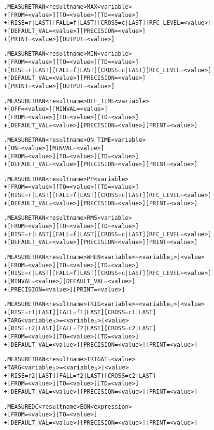 \begin{Command}
\begin{alltt}
.MEASURE TRAN <result name> MAX <variable>
+ [FROM=<value>] [TO=<value>] [TD=<value>]
+ [RISE=r|LAST] [FALL=f|LAST] [CROSS=c|LAST] [RFC_LEVEL=<value>]
+ [DEFAULT_VAL=<value>] [PRECISION=<value>] 
+ [PRINT=<value>] [OUTPUT=<value>]

.MEASURE TRAN <result name> MIN <variable>
+ [FROM=<value>] [TO=<value>] [TD=<value>]
+ [RISE=r|LAST] [FALL=f|LAST] [CROSS=c|LAST] [RFC_LEVEL=<value>]
+ [DEFAULT_VAL=<value>] [PRECISION=<value>] 
+ [PRINT=<value>] [OUTPUT=<value>]

.MEASURE TRAN <result name> OFF_TIME <variable>
+ [OFF=<value>] [MINVAL=<value>]
+ [FROM=<value>] [TO=<value>] [TD=<value>]
+ [DEFAULT_VAL=<value>] [PRECISION=<value>] [PRINT=<value>]

.MEASURE TRAN <result name> ON_TIME <variable>
+ [ON=<value>] [MINVAL=<value>]
+ [FROM=<value>] [TO=<value>] [TD=<value>]
+ [DEFAULT_VAL=<value>] [PRECISION=<value>] [PRINT=<value>]

.MEASURE TRAN <result name> PP <variable>
+ [FROM=<value>] [TO=<value>] [TD=<value>]
+ [RISE=r|LAST] [FALL=f|LAST] [CROSS=c|LAST] [RFC_LEVEL=<value>]
+ [DEFAULT_VAL=<value>] [PRECISION=<value>] [PRINT=<value>]

.MEASURE TRAN <result name> RMS <variable>
+ [FROM=<value>] [TO=<value>] [TD=<value>]
+ [RISE=r|LAST] [FALL=f|LAST] [CROSS=c|LAST] [RFC_LEVEL=<value>]
+ [DEFAULT_VAL=<value>] [PRECISION=<value>] [PRINT=<value>]

.MEASURE TRAN <result name> WHEN <variable>=<variable\(\sb{2}\)>|<value>
+ [FROM=<value>] [TO=<value>] [TD=<value>] 
+ [RISE=r|LAST] [FALL=f|LAST] [CROSS=c|LAST] [RFC_LEVEL=<value>]
+ [MINVAL=<value>] [DEFAULT_VAL=<value>] 
+ [PRECISION=<value>] [PRINT=<value>]

.MEASURE TRAN <result name> TRIG <variable>=<variable\(\sb{2}\)>|<value>
+ [RISE=r1|LAST] [FALL=f1|LAST] [CROSS=c1|LAST]
+ TARG <variable\(\sb{3}\)>=<variable\(\sb{4}\)>|<value> 
+ [RISE=r2|LAST] [FALL=f2|LAST] [CROSS=c2|LAST]
+ [FROM=<value>] [TO=<value>] [TD=<value>] 
+ [DEFAULT_VAL=<value>] [PRECISION=<value>] [PRINT=<value>]

.MEASURE TRAN <result name> TRIG AT=<value>
+ TARG <variable\(\sb{2}\)>=<variable\(\sb{3}\)>|<value> 
+ [RISE=r2|LAST] [FALL=f2|LAST] [CROSS=c2|LAST]
+ [FROM=<value>] [TO=<value>] [TD=<value>] 
+ [DEFAULT_VAL=<value>] [PRECISION=<value>] [PRINT=<value>]

.MEASURE DC <result name> EQN <expression> 
+ [FROM=<value>] [TO=<value>] 
+ [DEFAULT_VAL=<value>] [PRECISION=<value>] [PRINT=<value>]


\end{alltt}
\end{Command}
